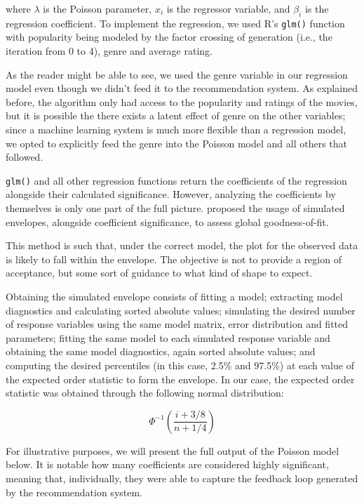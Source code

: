 \noindent where $\lambda$ is the Poisson parameter, $x_i$ is the regressor
variable, and $\beta_i$ is the regression coefficient. To implement the
regression, we used R's \verb|glm()| \citep{} function with popularity being
modeled by the factor crossing of generation (i.e., the iteration from 0 to 4),
genre and average rating.

As the reader might be able to see, we used the genre variable in our regression
model even though we didn't feed it to the recommendation system. As explained
before, the algorithm only had access to the popularity and ratings of the
movies, but it is possible the there exists a latent effect of genre on the
other variables; since a machine learning system is much more flexible than a
regression model, we opted to explicitly feed the genre into the Poisson model
and all others that followed.

\verb|glm()| and all other regression functions return the coefficients of the
regression alongside their calculated significance. However, analyzing the
coefficients by themselves is only one part of the full picture. \citet{}
proposed the usage of simulated envelopes, alongside coefficient significance,
to assess global goodness-of-fit.

This method is such that, under the correct model, the plot for the observed
data is likely to fall within the envelope. The objective is not to provide a
region of acceptance, but some sort of guidance to what kind of shape to expect.

Obtaining the simulated envelope consists of fitting a model; extracting model
diagnostics and calculating sorted absolute values; simulating the desired
number of response variables using the same model matrix, error distribution and
fitted parameters; fitting the same model to each simulated response variable
and obtaining the same model diagnostics, again sorted absolute values; and
computing the desired percentiles (in this case, 2.5\% and 97.5\%) at each value
of the expected order statistic to form the envelope. In our case, the expected
order statistic was obtained through the following normal distribution:

$$
\Phi^{-1}(\frac{i+3/8}{n+1/4})
$$

For illustrative purposes, we will present the full output of the Poisson model
below. It is notable how many coefficients are considered highly significant,
meaning that, individually, they were able to capture the feedback loop
generated by the recommendation system.

